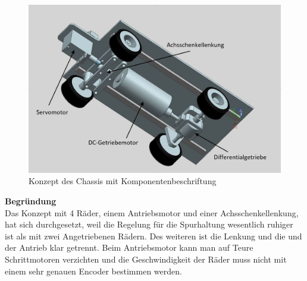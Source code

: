 \begin{figure}[H]%
\centering
\includegraphics[width=1\textwidth]{03_Loesungskonzept/pictures/Chassis_1.JPG}
\caption{Konzept des Chassis mit Komponentenbeschriftung}
\label{fig:activityRoute}
\end{figure}
\textbf{Begründung}
\\[0.2cm]
Das Konzept mit 4 Räder, einem Antriebsmotor und einer Achsschenkellenkung, hat sich durchgesetzt, weil die Regelung für die Spurhaltung wesentlich ruhiger ist als mit zwei Angetriebenen Rädern. Des weiteren ist die Lenkung und die und der Antrieb klar getrennt. Beim Antriebsmotor kann man auf Teure Schrittmotoren verzichten und die Geschwindigkeit der Räder muss nicht mit einem sehr genauen Encoder bestimmen werden.